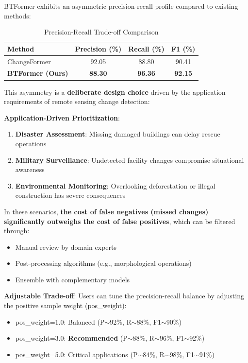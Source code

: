 \documentclass[journal]{IEEEtran}
\begin{document}
BTFormer exhibits an asymmetric precision-recall profile compared to existing methods:

\begin{table}[h]
\centering
\caption{Precision-Recall Trade-off Comparison}
\label{tab:pr_tradeoff}
\begin{tabular}{lccc}
\toprule
\textbf{Method} & \textbf{Precision (\%)} & \textbf{Recall (\%)} & \textbf{F1 (\%)} \\
\midrule
ChangeFormer & 92.05 & 88.80 & 90.41 \\
\textbf{BTFormer (Ours)} & \textbf{88.30} & \textbf{96.36} & \textbf{92.15} \\
\bottomrule
\end{tabular}
\end{table}

This asymmetry is a \textbf{deliberate design choice} driven by the application requirements of remote sensing change detection:

\textbf{Application-Driven Prioritization}:
\begin{enumerate}
    \item \textbf{Disaster Assessment}: Missing damaged buildings can delay rescue operations
    \item \textbf{Military Surveillance}: Undetected facility changes compromise situational awareness
    \item \textbf{Environmental Monitoring}: Overlooking deforestation or illegal construction has severe consequences
\end{enumerate}

In these scenarios, \textbf{the cost of false negatives (missed changes) significantly outweighs the cost of false positives}, which can be filtered through:
\begin{itemize}
    \item Manual review by domain experts
    \item Post-processing algorithms (e.g., morphological operations)
    \item Ensemble with complementary models
\end{itemize}

\textbf{Adjustable Trade-off}: Users can tune the precision-recall balance by adjusting the positive sample weight (pos\_weight):
\begin{itemize}
    \item pos\_weight=1.0: Balanced (P$\sim$92\%, R$\sim$88\%, F1$\sim$90\%)
    \item pos\_weight=3.0: \textbf{Recommended} (P$\sim$88\%, R$\sim$96\%, F1$\sim$92\%)
    \item pos\_weight=5.0: Critical applications (P$\sim$84\%, R$\sim$98\%, F1$\sim$91\%)
\end{itemize}
\end{document}
